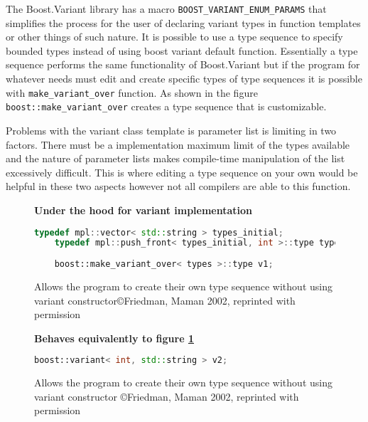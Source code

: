 \documentclass[letterpaper, 12pt]{article}
\newcommand{\inlinecode}[1]{\colorbox{codegrey}{\lstinline[language=C++]{#1}}}
\begin{document}
\newpage

The Boost.Variant library has a macro \inlinecode{BOOST_VARIANT_ENUM_PARAMS} that
simplifies the process for the user of declaring variant types in function templates or
other things of such nature. It is possible to use a type sequence to specify bounded types
instead of using boost variant default function. Essentially a type sequence performs the
same functionality of Boost.Variant but if the program for whatever needs must edit and
create specific types of type sequences it is possible with \inlinecode{make_variant_over}
function. As shown in the figure \inlinecode{boost::make_variant_over} creates a type sequence that
is customizable.
\par\vspace{\baselineskip}

Problems with the variant class template is parameter list is limiting in
two factors. There must be a implementation maximum limit of the types available and the
nature of parameter lists makes compile-time manipulation of the list excessively difficult.
This is where editing a type sequence on your own would be helpful in these two aspects
however not all compilers are able to this function.
\par\vspace{\baselineskip}

\begin{figure}
  \centering
  \textbf{Under the hood for variant implementation}
  \begin{lstlisting}[language=C++]
    typedef mpl::vector< std::string > types_initial;
    typedef mpl::push_front< types_initial, int >::type types;
    
    boost::make_variant_over< types >::type v1;
  \end{lstlisting}

  \cite{boostvariant}
  \caption{Allows the program to create their own type sequence without using variant constructor\copyright Friedman, Maman 2002, reprinted with permission} \label{typesequence}
\end{figure}

\begin{figure}
	\centering
	\textbf{Behaves equivalently to figure \ref{typesequence}}
	\begin{lstlisting}[language=C++]
		boost::variant< int, std::string > v2;
	\end{lstlisting}
	
	\cite{boostvariant}
	\caption{Allows the program to create their own type sequence without using variant constructor \copyright Friedman, Maman 2002, reprinted with permission} \label{typesequence2}
\end{figure}
\end{document}
